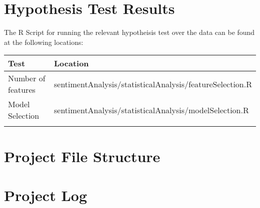 
\begin{appendices}

\section{Hypothesis Test Results}
\label{appendix:hypothesis}
The R Script for running the relevant hypotheisis test over the data can be found at the following locations:
\begin{center}

\begin{tabular}{|l|l|}
\hline
 Test &  Location\\ \hline
 Number of features &  sentimentAnalysis/statisticalAnalysis/featureSelection.R\\
 Model Selection &  sentimentAnalysis/statisticalAnalysis/modelSelection.R\\
 &  \\ \hline
\end{tabular}
\end{center}

\section{Project File Structure}

\section{Project Log}

\end{appendices}
